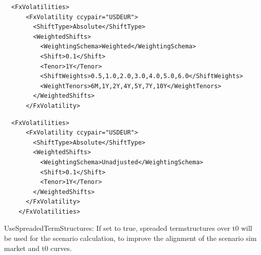 \begin{listing}
\begin{verbatim}
  <FxVolatilities>
      <FxVolatility ccypair="USDEUR">
        <ShiftType>Absolute</ShiftType>
        <WeightedShifts>
          <WeightingSchema>Weighted</WeightingSchema>
          <Shift>0.1</Shift>
          <Tenor>1Y</Tenor>
          <ShiftWeights>0.5,1.0,2.0,3.0,4.0,5.0,6.0</ShiftWeights>
          <WeightTenors>6M,1Y,2Y,4Y,5Y,7Y,10Y</WeightTenors>
        </WeightedShifts>
      </FxVolatility>
\end{verbatim}
\caption{Stress configuration with weighted shifts}
\label{lst:stress_config_fxvol_weighting}
\end{listing}

\begin{listing}
\begin{verbatim}
  <FxVolatilities>
      <FxVolatility ccypair="USDEUR">
        <ShiftType>Absolute</ShiftType>
        <WeightedShifts>
          <WeightingSchema>Unadjusted</WeightingSchema>
          <Shift>0.1</Shift>
          <Tenor>1Y</Tenor>
        </WeightedShifts>
      </FxVolatility>
    </FxVolatilities>
\end{verbatim}
\caption{Stress configuration with unadjusted weighting schema}
\label{lst:stress_config_fxvol_weighting_off}
\end{listing}

UseSpreadedTermStructures: If set to true, spreaded termstructures over t0 will be used for the scenario calculation, to
improve the alignment of the scenario sim market and t0 curves.

